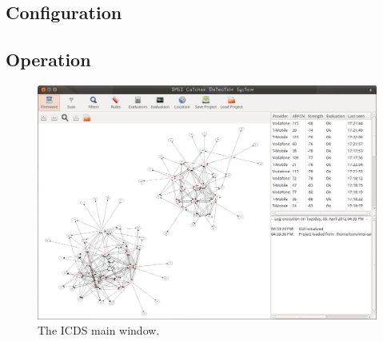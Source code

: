 \subsection{Configuration}
\label{sec:configuration}
\subsection{Operation}
\label{sec:icds_operation}
\begin{figure}
\centering
\includegraphics[width=.9\textwidth]{../Images/ICDS}
\caption{The ICDS main window.}
\label{fig:icds}
\end{figure}